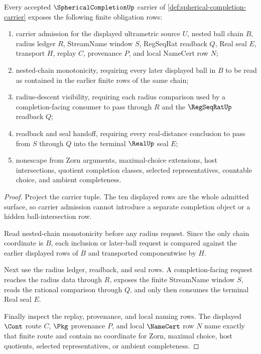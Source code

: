 \begin{theorem}
\label{thm:spherical-completion-namecert-obligations}
Every accepted $\SphericalCompletionUp$ carrier of \autoref{def:spherical-completion-carrier} exposes the following finite obligation rows:
\begin{enumerate}
\item carrier admission for the displayed ultrametric source $U$, nested ball chain $B$, radius ledger $R$, StreamName window $S$, RegSeqRat readback $Q$, Real seal $E$, transport $H$, replay $C$, provenance $P$, and local NameCert row $N$;
\item nested-chain monotonicity, requiring every later displayed ball in $B$ to be read as contained in the earlier finite rows of the same chain;
\item radius-descent visibility, requiring each radius comparison used by a completion-facing consumer to pass through $R$ and the $\RegSeqRatUp$ readback $Q$;
\item readback and seal handoff, requiring every real-distance conclusion to pass from $S$ through $Q$ into the terminal $\RealUp$ seal $E$;
\item nonescape from Zorn arguments, maximal-choice extensions, host intersections, quotient completion classes, selected representatives, countable choice, and ambient completeness.
\end{enumerate}
\end{theorem}
\begin{proof}
Project the carrier tuple. The ten displayed rows are the whole admitted surface, so carrier admission cannot introduce a separate completion object or a hidden ball-intersection row.

Read nested-chain monotonicity before any radius request. Since the only chain coordinate is $B$, each inclusion or later-ball request is compared against the earlier displayed rows of $B$ and transported componentwise by $H$.

Next use the radius ledger, readback, and seal rows. A completion-facing request reaches the radius data through $R$, exposes the finite StreamName window $S$, reads the rational comparison through $Q$, and only then consumes the terminal Real seal $E$.

Finally inspect the replay, provenance, and local naming rows. The displayed $\Cont$ route $C$, $\Pkg$ provenance $P$, and local $\NameCert$ row $N$ name exactly that finite route and contain no coordinate for Zorn, maximal choice, host quotients, selected representatives, or ambient completeness.
\end{proof}


